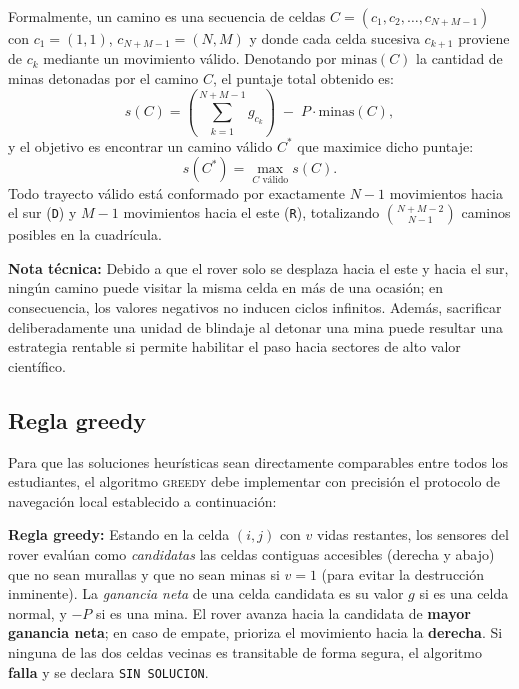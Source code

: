 Formalmente, un camino es una secuencia de celdas $C = (c_1, c_2, \dots, c_{N+M-1})$ con $c_1 = (1,1)$, $c_{N+M-1} = (N,M)$ y donde cada celda sucesiva $c_{k+1}$ proviene de $c_k$ mediante un movimiento válido. Denotando por $\mathrm{minas}(C)$ la cantidad de minas detonadas por el camino $C$, el puntaje total obtenido es:
\[
  s(C) = \left( \sum_{\substack{k=1}}^{N+M-1} g_{c_k} \right) \;-\; P \cdot \mathrm{minas}(C),
\]
y el objetivo es encontrar un camino válido $C^{*}$ que maximice dicho puntaje:
\[
  s(C^{*}) = \max_{C \text{ válido}} s(C).
\]
Todo trayecto válido está conformado por exactamente $N-1$ movimientos hacia el sur (\texttt{D}) y $M-1$ movimientos hacia el este (\texttt{R}), totalizando $\binom{N+M-2}{N-1}$ caminos posibles en la cuadrícula.

\begin{mdframed}[linecolor=blue!60!black, backgroundcolor=blue!5,
                 linewidth=1pt, roundcorner=5pt, innertopmargin=8pt,
                 innerbottommargin=8pt]
\textbf{Nota técnica:} Debido a que el rover solo se desplaza hacia el este y hacia el sur, ningún camino puede visitar la misma celda en más de una ocasión; en consecuencia, los valores negativos no inducen ciclos infinitos. Además, sacrificar deliberadamente una unidad de blindaje al detonar una mina puede resultar una estrategia rentable si permite habilitar el paso hacia sectores de alto valor científico.
\end{mdframed}

\subsection{Regla greedy}\label{subsec:regla-greedy}
Para que las soluciones heurísticas sean directamente comparables entre todos los estudiantes, el algoritmo \textsc{greedy} debe implementar con precisión el protocolo de navegación local establecido a continuación:

\begin{mdframed}[linecolor=blue!60!black, backgroundcolor=blue!5,
                 linewidth=1pt, roundcorner=5pt, innertopmargin=8pt,
                 innerbottommargin=8pt]
\textbf{Regla greedy:} Estando en la celda $(i,j)$ con $v$ vidas restantes, los sensores del rover evalúan como \emph{candidatas} las celdas contiguas accesibles (derecha y abajo) que no sean murallas y que no sean minas si $v = 1$ (para evitar la destrucción inminente). La \emph{ganancia neta} de una celda candidata es su valor $g$ si es una celda normal, y $-P$ si es una mina. El rover avanza hacia la candidata de \textbf{mayor ganancia neta}; en caso de empate, prioriza el movimiento hacia la \textbf{derecha}. Si ninguna de las dos celdas vecinas es transitable de forma segura, el algoritmo \textbf{falla} y se declara \texttt{SIN SOLUCION}.
\end{mdframed}

